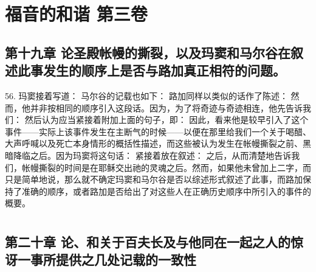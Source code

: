 \section{福音的和谐 第三卷}


\subsection{第十九章 论圣殿帐幔的撕裂，以及玛窦和马尔谷在叙述此事发生的顺序上是否与路加真正相符的问题。}

56. 玛窦接着写道： 马尔谷的记载也如下： 路加同样以类似的话作了陈述： 然而，他并非按相同的顺序引入这段话。因为，为了将奇迹与奇迹相连，他先告诉我们： 然后认为应当紧接着附加上面的句子，即： 因此，看来他是较早引入了这个事件——实际上该事件发生在主断气的时候——以便在那里给我们一个关于喝醋、大声呼喊以及死亡本身情形的概括性描述，而这些被认为发生在帐幔撕裂之前、黑暗降临之后。因为玛窦将这句话： 紧接着放在叙述： 之后，从而清楚地告诉我们，帐幔撕裂的时间是在耶稣交出祂的灵魂之后。然而，如果他未曾加上二字，而只是简单地说，那么就不确定玛窦和马尔谷是否以综述形式叙述了此事，而路加保持了准确的顺序，或者路加是否给出了对这些人在正确历史顺序中所引入的事件的概要。\par



\section{}


\subsection{第二十章 论、和关于百夫长及与他同在一起之人的惊讶一事所提供之几处记载的一致性}

